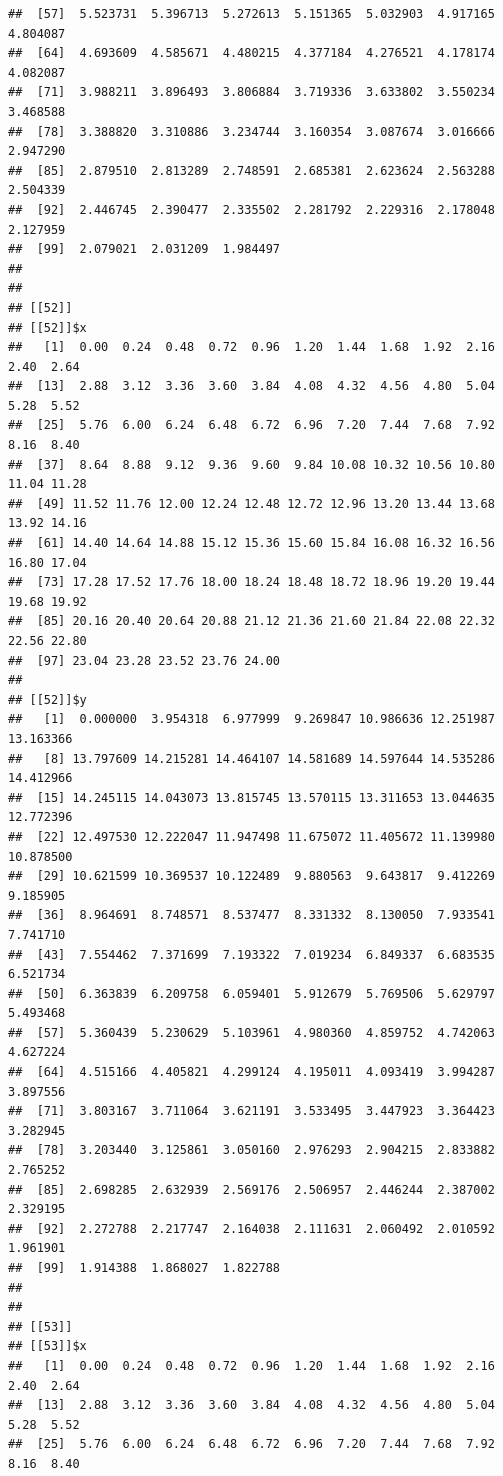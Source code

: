 \documentclass[
  ignorenonframetext,
]{beamer}
\begin{document}
\begin{frame}[fragile]{}
\begin{verbatim}
##  [57]  5.523731  5.396713  5.272613  5.151365  5.032903  4.917165  4.804087
##  [64]  4.693609  4.585671  4.480215  4.377184  4.276521  4.178174  4.082087
##  [71]  3.988211  3.896493  3.806884  3.719336  3.633802  3.550234  3.468588
##  [78]  3.388820  3.310886  3.234744  3.160354  3.087674  3.016666  2.947290
##  [85]  2.879510  2.813289  2.748591  2.685381  2.623624  2.563288  2.504339
##  [92]  2.446745  2.390477  2.335502  2.281792  2.229316  2.178048  2.127959
##  [99]  2.079021  2.031209  1.984497
## 
## 
## [[52]]
## [[52]]$x
##   [1]  0.00  0.24  0.48  0.72  0.96  1.20  1.44  1.68  1.92  2.16  2.40  2.64
##  [13]  2.88  3.12  3.36  3.60  3.84  4.08  4.32  4.56  4.80  5.04  5.28  5.52
##  [25]  5.76  6.00  6.24  6.48  6.72  6.96  7.20  7.44  7.68  7.92  8.16  8.40
##  [37]  8.64  8.88  9.12  9.36  9.60  9.84 10.08 10.32 10.56 10.80 11.04 11.28
##  [49] 11.52 11.76 12.00 12.24 12.48 12.72 12.96 13.20 13.44 13.68 13.92 14.16
##  [61] 14.40 14.64 14.88 15.12 15.36 15.60 15.84 16.08 16.32 16.56 16.80 17.04
##  [73] 17.28 17.52 17.76 18.00 18.24 18.48 18.72 18.96 19.20 19.44 19.68 19.92
##  [85] 20.16 20.40 20.64 20.88 21.12 21.36 21.60 21.84 22.08 22.32 22.56 22.80
##  [97] 23.04 23.28 23.52 23.76 24.00
## 
## [[52]]$y
##   [1]  0.000000  3.954318  6.977999  9.269847 10.986636 12.251987 13.163366
##   [8] 13.797609 14.215281 14.464107 14.581689 14.597644 14.535286 14.412966
##  [15] 14.245115 14.043073 13.815745 13.570115 13.311653 13.044635 12.772396
##  [22] 12.497530 12.222047 11.947498 11.675072 11.405672 11.139980 10.878500
##  [29] 10.621599 10.369537 10.122489  9.880563  9.643817  9.412269  9.185905
##  [36]  8.964691  8.748571  8.537477  8.331332  8.130050  7.933541  7.741710
##  [43]  7.554462  7.371699  7.193322  7.019234  6.849337  6.683535  6.521734
##  [50]  6.363839  6.209758  6.059401  5.912679  5.769506  5.629797  5.493468
##  [57]  5.360439  5.230629  5.103961  4.980360  4.859752  4.742063  4.627224
##  [64]  4.515166  4.405821  4.299124  4.195011  4.093419  3.994287  3.897556
##  [71]  3.803167  3.711064  3.621191  3.533495  3.447923  3.364423  3.282945
##  [78]  3.203440  3.125861  3.050160  2.976293  2.904215  2.833882  2.765252
##  [85]  2.698285  2.632939  2.569176  2.506957  2.446244  2.387002  2.329195
##  [92]  2.272788  2.217747  2.164038  2.111631  2.060492  2.010592  1.961901
##  [99]  1.914388  1.868027  1.822788
## 
## 
## [[53]]
## [[53]]$x
##   [1]  0.00  0.24  0.48  0.72  0.96  1.20  1.44  1.68  1.92  2.16  2.40  2.64
##  [13]  2.88  3.12  3.36  3.60  3.84  4.08  4.32  4.56  4.80  5.04  5.28  5.52
##  [25]  5.76  6.00  6.24  6.48  6.72  6.96  7.20  7.44  7.68  7.92  8.16  8.40

\end{verbatim}
\end{frame}
\end{document}
